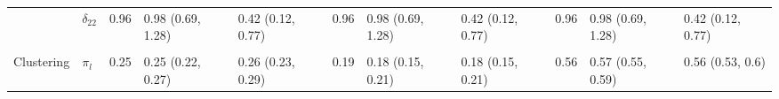 \documentclass[]{article}
\begin{document}
\begin{landscape}
\begin{table}[t]
\begin{tabular}{lllllllllll}
\hspace{1em} & $\delta_{22}$ & 0.96 & 0.98 (0.69, 1.28) & 0.42 (0.12, 0.77) & 0.96 & 0.98 (0.69, 1.28) & 0.42 (0.12, 0.77) & 0.96 & 0.98 (0.69, 1.28) & 0.42 (0.12, 0.77)\\
\addlinespace[0.3em]
\multicolumn{11}{l}{\textbf{ }}\\
\hspace{1em}Clustering & $\pi_l$ & 0.25 & 0.25 (0.22, 0.27) & 0.26 (0.23, 0.29) & 0.19 & 0.18 (0.15, 0.21) & 0.18 (0.15, 0.21) & 0.56 & 0.57 (0.55, 0.59) & 0.56 (0.53, 0.6)\\
\bottomrule
\end{tabular}
\end{table}
\end{landscape}
\end{document}
